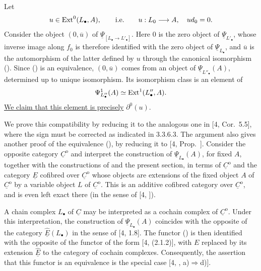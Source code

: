 Let
\[
 u\in\operatorname{Ext}^0(L_\bullet,A),
 \qquad\text{i.e.}\qquad
 u:L_0\longrightarrow A,\quad ud_0=0.
\]
Consider the object $(0,\overline u)$ of
$\underline\Psi_{[L_\bullet\to L'_\bullet]}$.  Here $0$ is the
zero object of $\underline\Psi_{L'_\bullet}$, whose inverse image
along $f_0$ is therefore identified with the zero object of
$\underline\Psi_{L_\bullet}$, and $\overline u$ is the automorphism
of the latter defined by $u$ through the canonical isomorphism
().  Since () is an equivalence, $(0,\overline u)$ comes
from an object of $\underline\Psi_{L''_\bullet}(A)$, determined up
to unique isomorphism.  Its isomorphism class is an element of
\[
 \Psi^1_{L''_\bullet}(A)\simeq\operatorname{Ext}^1(L''_\bullet,A).
\]
\underline{We claim that this element is precisely}
$\partial^0(u)$.

We prove this compatibility by reducing it to the analogous one in
[4, Cor.~5.5], where the sign must be corrected as indicated in
3.3.6.3.  The argument also gives another proof of the equivalence
(), by reducing it to [4, Prop.~].  Consider the opposite
category $\underline C^{\mathrm o}$ and interpret the construction
of $\underline\Psi_{L_\bullet}(A)$, for fixed $A$, together with
the constructions of  and the present section, in terms of
$\underline C^{\mathrm o}$ and the category $\underline E$ cofibred
over $\underline C^{\mathrm o}$ whose objects are extensions of the
fixed object $A$ of $\underline C^{\mathrm o}$ by a variable object
$L$ of $\underline C^{\mathrm o}$.  This is an additive cofibred
category over $\underline C^{\mathrm o}$, and is even left exact
there (in the sense of [4, ]).

A chain complex $L_\bullet$ of $\underline C$ may be interpreted as
a cochain complex of $\underline C^{\mathrm o}$.  Under this
interpretation, the construction of $\underline\Psi_{L_\bullet}(A)$
coincides with the opposite of the category
$\underline{\widehat E}(L_\bullet)$ in the sense of [4, 1.8].  The
functor () is then identified with the opposite of the functor
of the form [4, (2.1.2)], with $E$ replaced by its extension
$\underline{\widehat E}$ to the category of cochain complexes.
Consequently, the assertion that this functor is an equivalence is
the special case [4, , a)$\Rightarrow$d)].

